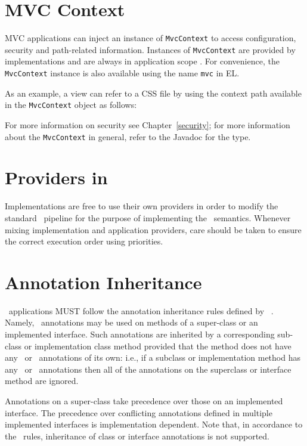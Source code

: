 \section{MVC Context}
\label{mvc_context}

MVC applications can inject an instance of {\tt MvcContext} to access configuration,
security and path-related information. Instances of {\tt MvcContext} are provided
by implementations and are always in application scope . 
For convenience, the
{\tt MvcContext} instance is also available using the name {\tt mvc} in EL.

As an example, a view can refer to a CSS file by using the context path available in 
the {\tt MvcContext} object as follows:



For more information on security see Chapter~\ref{security}; for more information 
about the {\tt MvcContext} in general, refer to the Javadoc for the type.

\section{Providers in \mvc}
\label{providers_in_mvc}

Implementations are free to use their own providers in order to modify the standard 
\jaxrs\ pipeline for the purpose of implementing the \mvc\ semantics. Whenever mixing 
implementation and application providers, care should be taken to ensure the correct 
execution order using priorities.

\section{Annotation Inheritance}
\label{annotation_inheritance}

\mvc\  applications MUST follow the annotation inheritance rules defined by \jaxrs\ 
. Namely, \mvc\ annotations may be used on methods of a 
super-class or an implemented interface. Such annotations are inherited 
by a corresponding sub-class or implementation class method provided that the method does 
not have any \mvc\ or \jaxrs\ annotations of its own: 
i.e., if a subclass or implementation method has any \mvc\ or \jaxrs\ annotations then all of the
annotations on the superclass or interface method are ignored.

Annotations on a super-class take precedence over those on an implemented interface. The
precedence over conflicting annotations defined in multiple implemented interfaces is implementation dependent.
Note that, in accordance to the \jaxrs\ rules, inheritance of class or interface annotations 
is not supported. 
